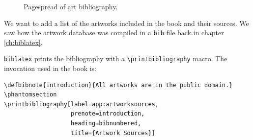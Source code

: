 \documentclass[12pt,a4,oneside,usenames,dvipsnames]{book}
\newcommand\biblatex{\texttt{biblatex}\xspace}%
\begin{document}
\begin{figure}
  \centering
  \qquad\begin{minipage}{0.3\textwidth}%
  \end{minipage}%
  \quad\begin{minipage}{0.3\textwidth}%
  \end{minipage}%
  \caption{\footnotesize{}Pagespread of art bibliography.}
\end{figure}

We want to add a list of the artworks included in the book and their
sources. We saw how the artwork database was compiled in a \texttt{bib}
file back in chapter \hyperref[ch:biblatex]{\ref{ch:biblatex}}.

\biblatex prints the bibliography with a
\texttt{\textbackslash{}printbibliography} macro. The invocation used in
the book is:

\begin{verbatim}
\defbibnote{introduction}{All artworks are in the public domain.}
\phantomsection
\printbibliography[label=app:artworksources,
                   prenote=introduction,
                   heading=bibnumbered,
                   title={Artwork Sources}]
\end{verbatim}
\end{document}
